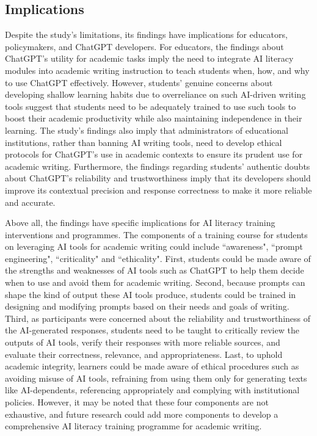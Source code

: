 \documentclass[english]{textolivre}
\begin{document}
\subsection{Implications}
Despite the study’s limitations, its findings have implications for educators, policymakers, and ChatGPT developers. For educators, the findings about ChatGPT’s utility for academic tasks imply the need to integrate AI literacy modules into academic writing instruction to teach students when, how, and why to use ChatGPT effectively. However, students’ genuine concerns about developing shallow learning habits due to overreliance on such AI-driven writing tools suggest that students need to be adequately trained to use such tools to boost their academic productivity while also maintaining independence in their learning. The study’s findings also imply that administrators of educational institutions, rather than banning AI writing tools, need to develop ethical protocols for ChatGPT’s use in academic contexts to ensure its prudent use for academic writing. Furthermore, the findings regarding students’ authentic doubts about ChatGPT’s reliability and trustworthiness imply that its developers should improve its contextual precision and response correctness to make it more reliable and accurate.

Above all, the findings have specific implications for AI literacy training interventions and programmes. The components of a training course for students on leveraging AI tools for academic writing could include ``awareness", ``prompt engineering", ``criticality" and ``ethicality". First, students could be made aware of the strengths and weaknesses of AI tools such as ChatGPT to help them decide when to use and avoid them for academic writing. Second, because prompts can shape the kind of output these AI tools produce, students could be trained in designing and modifying prompts based on their needs and goals of writing. Third, as participants were concerned about the reliability and trustworthiness of the AI-generated responses, students need to be taught to critically review the outputs of AI tools, verify their responses with more reliable sources, and evaluate their correctness, relevance, and appropriateness. Last, to uphold academic integrity, learners could be made aware of ethical procedures such as avoiding misuse of AI tools, refraining from using them only for generating texts like AI-dependents, referencing appropriately and complying with institutional policies. However, it may be noted that these four components are not exhaustive, and future research could add more components to develop a comprehensive AI literacy training programme for academic writing.
\end{document}
